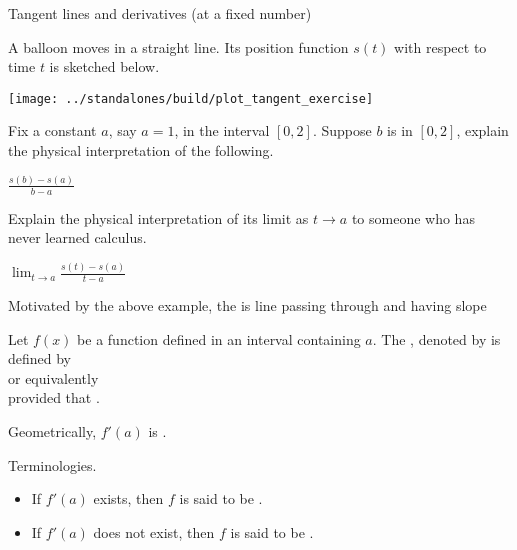 \documentclass[../main.tex]{subfiles}
\begin{document}
\begin{lesson}{Tangent lines and derivatives (at a fixed number)}

  A balloon moves in a straight line. Its position function \(s(t)\) with respect to time \(t\) is sketched below. 

  \begin{center}
    \texttt{[image: ../standalones/build/plot\_tangent\_exercise]}
  \end{center}

  Fix a constant \(a\), say \(a = 1\), in the interval \([0,2]\). Suppose \(b\) is in \([0,2]\), explain the physical interpretation of the following. 

  \(\frac{s(b) - s(a)}{b - a}\)

  Explain the physical interpretation of its limit as \(t \to a\) to someone who has never learned calculus. 

  \(\lim_{t \to a} \frac{s(t) - s(a)}{t - a}\)

  Motivated by the above example, the  is \underline{\hspace{2cm}} line passing through \underline{\hspace{2in}} and having slope 
  \clearpage

  \begin{mdframed}[style=simple]
    Let \(f(x)\) be a function defined in an \underline{\hspace{1in}} interval containing \(a\). The , denoted by  is defined by
    \begin{equation}\label{eq:def-derivative-1}
    \end{equation}
    or equivalently 
    \begin{equation}\label{eq:def-derivative-2}
    \end{equation}
    provided that \underline{\hspace{2in}}.

  \end{mdframed}

  \faStar{} Geometrically, \(f'(a)\) is \underline{\hspace{5in}}.

  Terminologies. 
  \begin{itemize}
    \item If \(f'(a)\) exists, then \(f\) is said to be .
    \item If \(f'(a)\) does not exist, then \(f\) is said to be .
  \end{itemize}


\end{lesson}
\end{document}
